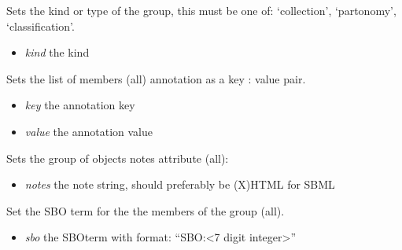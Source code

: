 \documentclass[a4paper,11pt,english]{sphinxmanual}
\begin{document}
\begin{fulllineitems}

\begin{fulllineitems}
\label{modules_doc:cbmpy.CBModel.Group.setKind}
Sets the kind or type of the group, this must be one of: `collection', `partonomy', `classification'.
\begin{itemize}
\item {} 
\emph{kind} the kind

\end{itemize}

\end{fulllineitems}


\begin{fulllineitems}
\label{modules_doc:cbmpy.CBModel.Group.setSharedAnnotation}
Sets the list of members (all) annotation as a key : value pair.
\begin{itemize}
\item {} 
\emph{key} the annotation key

\item {} 
\emph{value} the annotation value

\end{itemize}

\end{fulllineitems}


\begin{fulllineitems}
\label{modules_doc:cbmpy.CBModel.Group.setSharedNotes}
Sets the group of objects notes attribute (all):
\begin{itemize}
\item {} 
\emph{notes} the note string, should preferably be (X)HTML for SBML

\end{itemize}

\end{fulllineitems}


\begin{fulllineitems}
\label{modules_doc:cbmpy.CBModel.Group.setSharedSBOterm}
Set the SBO term for the the members of the group (all).
\begin{itemize}
\item {} 
\emph{sbo} the SBOterm with format: ``SBO:\textless{}7 digit integer\textgreater{}''

\end{itemize}

\end{fulllineitems}


\end{fulllineitems}
\end{document}
